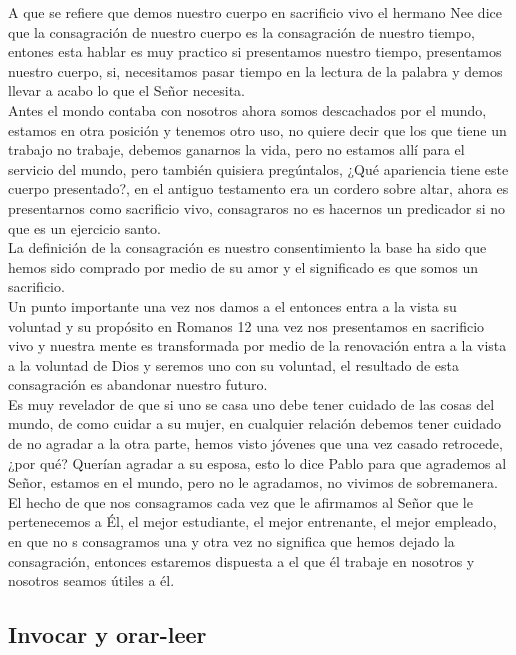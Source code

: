 \documentclass[12pt]{article}
\begin{document}
A que se refiere que demos nuestro cuerpo en sacrificio vivo el hermano Nee dice que la consagración de nuestro cuerpo es la consagración de nuestro tiempo, entones esta hablar es muy practico si presentamos nuestro tiempo, presentamos nuestro cuerpo, si, necesitamos pasar tiempo en la lectura de la palabra y demos llevar a acabo lo que el Señor necesita.\\

Antes el mondo contaba con nosotros ahora somos descachados por el mundo, estamos en otra posición y tenemos otro uso, no quiere decir que los que tiene un trabajo no trabaje, debemos ganarnos la vida, pero no estamos allí para el servicio del mundo, pero también quisiera pregúntalos, ¿Qué apariencia tiene este cuerpo presentado?, en el antiguo testamento era un cordero sobre altar, ahora es presentarnos como sacrificio vivo, consagraros no es hacernos un predicador si no que es un ejercicio santo.\\

La definición de la consagración es nuestro consentimiento la base ha sido que hemos sido comprado por medio de su amor y el significado es que somos un sacrificio.\\

Un punto importante una vez nos damos a el entonces entra a la vista su voluntad y su propósito en Romanos 12 una vez nos presentamos en sacrificio vivo y nuestra mente es transformada por medio de la renovación entra a la vista a la voluntad de Dios y seremos uno con su voluntad, el resultado de esta consagración es abandonar nuestro futuro.\\

Es muy revelador de que si uno se casa uno debe tener cuidado de las cosas del mundo, de como cuidar a su mujer, en cualquier relación debemos tener cuidado de no agradar a la otra parte, hemos visto jóvenes que una vez casado retrocede, ¿por qué? Querían agradar a su esposa, esto lo dice Pablo para que agrademos al Señor, estamos en el mundo, pero no le agradamos, no vivimos de sobremanera.\\

El hecho de que nos consagramos cada vez que le afirmamos al Señor que le pertenecemos a Él, el mejor estudiante, el mejor entrenante, el mejor empleado, en que no s consagramos una y otra vez no significa que hemos dejado la consagración, entonces estaremos dispuesta a el que él trabaje en nosotros y nosotros seamos útiles a él.\\

\subsection*{Invocar y orar-leer}
\end{document}
